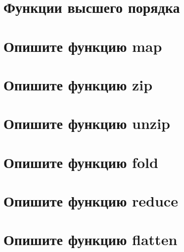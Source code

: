 \documentclass[12pt]{article}
\begin{document}
\section*{Функции высшего порядка}
\begin{enumerate}[leftmargin=*]
\end{enumerate}
\vspace{2mm}
\section*{Опишите функцию map}
\begin{enumerate}[leftmargin=*]
\end{enumerate}
\vspace{2mm}
\section*{Опишите функцию zip}
\begin{enumerate}[leftmargin=*]
\end{enumerate}
\vspace{2mm}
\section*{Опишите функцию unzip}
\begin{enumerate}[leftmargin=*]
\end{enumerate}
\vspace{2mm}
\section*{Опишите функцию fold}
\begin{enumerate}[leftmargin=*]
\end{enumerate}
\vspace{2mm}
\section*{Опишите функцию reduce}
\begin{enumerate}[leftmargin=*]
\end{enumerate}
\vspace{2mm}
\section*{Опишите функцию flatten}
\begin{enumerate}[leftmargin=*]
\end{enumerate}
\vspace{2mm}
\end{document}
